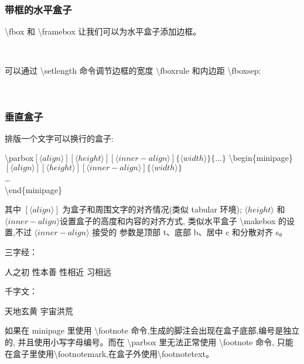 \documentclass[a4paper]{ctexart}
\begin{document}
    \subsubsection{带框的水平盒子}
    \textbackslash fbox 和 \textbackslash framebox 让我们可以为水平盒子添加边框。\par
    \\
    \par
    可以通过 \textbackslash setlength 命令调节边框的宽度 \textbackslash fboxrule %
    和内边距 \textbackslash fboxsep:\par
    \\
    \setlength{\fboxrule}{1.6pt}
    \setlength{\fboxsep}{1em}
    \par
    \subsubsection{垂直盒子}
    排版一个文字可以换行的盒子:\par
    \textbackslash parbox$[\langle align\rangle][\langle height\rangle][\langle inner-align\rangle]\{\langle width\rangle\}\{\ldots \}$
    \textbackslash begin\{minipage\}$[\langle align\rangle][\langle height\rangle][\langle inner-align\rangle]\{\langle width\rangle\}$\\
    \ldots\\
    \textbackslash end\{minipage\}\par
    其中 $[\langle align\rangle]$ 为盒子和周围文字的对齐情况(类似 tabular 环境); %
    $\langle height\rangle$ 和 $\langle inner-align\rangle$设置盒子的高度和内容的对齐方式,%
    类似水平盒子 \textbackslash makebox 的设置,不过 $\langle inner-align\rangle$ 接受的%
    参数是顶部 t、底部 b、居中 c 和分散对齐 s。\par
    三字经：\parbox[t]{3em}{人之初 性本善 性相近 习相远}
    \quad
    千字文：
    \begin{minipage}[b][8ex][t]{4em}
        天地玄黄 宇宙洪荒
    \end{minipage}\par
    如果在 minipage 里使用 \textbackslash footnote 命令,生成的脚注会出现在盒子底部,编号是独立的, %
    并且使用小写字母编号。而在 \textbackslash parbox 里无法正常使用 \textbackslash footnote 命令,%
    只能在盒子里使用\textbackslash footnotemark,在盒子外使用\textbackslash footnotetext。\par
    \par
\end{document}
